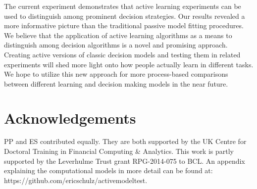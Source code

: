 \documentclass[10pt,letterpaper]{article}
\begin{document}
The current experiment demonstrates that active learning experiments can be used to distinguish among prominent decision strategies. Our results revealed a more informative picture than the traditional passive model fitting procedures. We believe that the application of active learning algorithms as a means to distinguish among decision algorithms is a novel and promising approach. Creating active versions of classic decision models and testing them in related experiments will shed more light onto how people actually learn in different tasks. We hope to utilize this new approach for more process-based comparisons between different learning and decision making models in the near future.
\section{Acknowledgements}
PP and ES contributed equally. They are both supported by the UK Centre for Doctoral Training in Financial Computing \& Analytics.  This work is partly supported by the Leverhulme Trust grant RPG-2014-075 to BCL. An appendix explaining the computational models in more detail can be found at: https://github.com/ericschulz/activemodeltest.
\footnotesize


\end{document}
